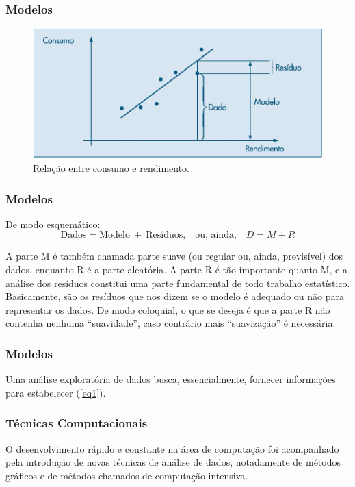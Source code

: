 \documentclass[14pt,aspectratio=1610]{beamer}
\begin{document}
\begin{frame}{}
\frametitle{Modelos}
\begin{figure}[H]
    \centering
    \includegraphics[scale=0.5]{Fig1}
    \caption{Relação entre consumo e rendimento.}
    \label{fig_ex1}
  \end{figure}
\end{frame}

\begin{frame}{}
\frametitle{Modelos}
\begin{block}{}
\justifying
De modo esquemático:
\begin{equation}
\label{eq1}
\textrm{Dados}=\textrm{Modelo}\ +\ \textrm{Resíduos,}\quad \textrm{ou, ainda,}\quad 
D=M+R
\end{equation}
\end{block}
\pause
\begin{block}{}
\justifying
A parte M é também chamada parte suave (ou regular ou, ainda, previsível) dos
dados, enquanto R é a parte aleatória. A parte R é tão importante quanto M, e a análise dos resíduos constitui uma parte fundamental de todo trabalho estatístico. Basicamente, são os resíduos que nos dizem se o modelo é adequado ou não para representar os dados. De modo coloquial, o que se deseja é que a parte R não contenha nenhuma “suavidade”, caso contrário mais “suavização” é necessária.
\end{block}
\end{frame}

\begin{frame}{}
\frametitle{Modelos}
\begin{block}{}
\justifying
Uma análise exploratória de dados busca, essencialmente, fornecer informações
para estabelecer (\ref{eq1}).
\end{block}
\end{frame}

\begin{frame}{}
\frametitle{Técnicas Computacionais}
\begin{block}{}
\justifying
O desenvolvimento rápido e constante na área de computação foi acompanhado pela
introdução de novas técnicas de análise de dados, notadamente de métodos gráficos e de métodos chamados de computação intensiva.
\end{block}
\end{frame}
\end{document}
